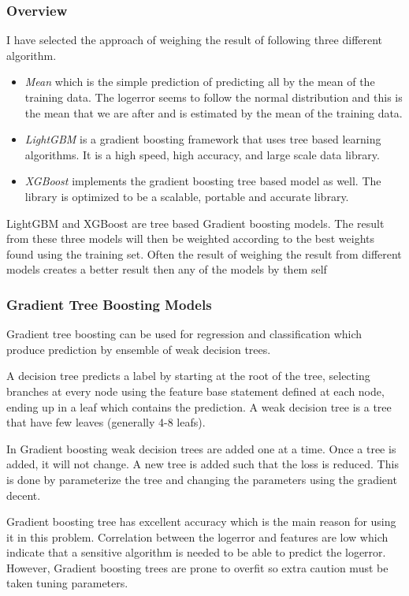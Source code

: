 \documentclass[a4paper]{article}
\begin{document}
\subsubsection{Overview}
I have selected the approach of weighing the result of following three different algorithm.
\begin{itemize}
    \item
        \textit{Mean} which is the simple prediction of predicting all by the mean of the training data. The logerror seems to follow the normal distribution and this is the mean that we are after and is estimated by the mean of the training data.
    \item
        \textit{LightGBM} \cite{lightgbm} is a gradient boosting framework that uses tree based learning algorithms. It is a high speed, high accuracy, and large scale data library.
    \item
        \textit{XGBoost} \cite{xgboost} implements the gradient boosting tree based model as well. The library is optimized to be a scalable, portable and accurate library.
\end{itemize}
LightGBM \cite{lightgbm} and XGBoost \cite{xgboost} are tree based Gradient boosting models. The result from these three models will then be weighted according to the best weights found using the training set. Often the result of weighing the result from different models creates a better result then any of the models by them self

\subsubsection{Gradient Tree Boosting Models}
Gradient tree boosting can be used for regression and classification which produce prediction by ensemble of weak decision trees.

A decision tree predicts a label by starting at the root of the tree, selecting branches at every node using the feature base statement defined at each node, ending up in a leaf which contains the prediction. A weak decision tree is a tree that have few leaves (generally 4-8 leafs).

In Gradient boosting weak decision trees are added one at a time. Once a tree is added, it will not change. A new tree is added such that the loss is reduced. This is done by parameterize the tree and changing the parameters using the gradient decent.

Gradient boosting tree has excellent accuracy which is the main reason for using it in this problem. Correlation between the logerror and features are low which indicate that a sensitive algorithm is needed to be able to predict the logerror. However, Gradient boosting trees are prone to overfit so extra caution must be taken tuning parameters.
\end{document}
